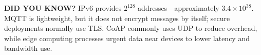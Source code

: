\begin{tcolorbox}[
  colback=SoftYellow,
  colframe=IEEEblue!70!black,
  boxrule=0.6pt,
  arc=0mm,
  left=3mm,right=3mm,top=2mm,bottom=2mm
]
\small
{\sffamily\bfseries\color{IEEEblue!75!black}DID YOU KNOW?}\quad
IPv6 provides $2^{128}$ addresses---approximately $3.4\times10^{38}$. MQTT is lightweight, but it does not encrypt messages by itself; secure deployments normally use TLS. CoAP commonly uses UDP to reduce overhead, while edge computing processes urgent data near devices to lower latency and bandwidth use.
\end{tcolorbox}